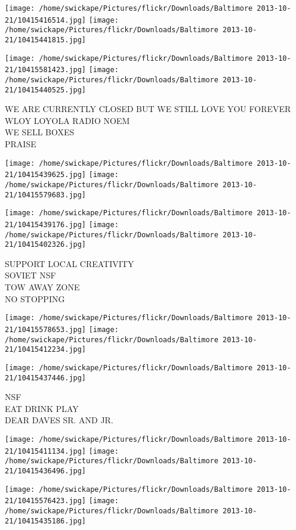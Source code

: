 \documentclass[10pt,letterpaper]{article}
\begin{document}
\texttt{[image: /home/swickape/Pictures/flickr/Downloads/Baltimore 2013-10-21/10415416514.jpg]}
\texttt{[image: /home/swickape/Pictures/flickr/Downloads/Baltimore 2013-10-21/10415441815.jpg]}

\texttt{[image: /home/swickape/Pictures/flickr/Downloads/Baltimore 2013-10-21/10415581423.jpg]}
\texttt{[image: /home/swickape/Pictures/flickr/Downloads/Baltimore 2013-10-21/10415440525.jpg]}

WE ARE CURRENTLY CLOSED BUT WE STILL LOVE YOU FOREVER\\
WLOY LOYOLA RADIO NOEM\\
WE SELL BOXES\\
PRAISE
\pagebreak

\texttt{[image: /home/swickape/Pictures/flickr/Downloads/Baltimore 2013-10-21/10415439625.jpg]}
\texttt{[image: /home/swickape/Pictures/flickr/Downloads/Baltimore 2013-10-21/10415579683.jpg]}

\texttt{[image: /home/swickape/Pictures/flickr/Downloads/Baltimore 2013-10-21/10415439176.jpg]}
\texttt{[image: /home/swickape/Pictures/flickr/Downloads/Baltimore 2013-10-21/10415402326.jpg]}

SUPPORT LOCAL CREATIVITY\\
SOVIET NSF\\
TOW AWAY ZONE\\
NO STOPPING
\pagebreak

\texttt{[image: /home/swickape/Pictures/flickr/Downloads/Baltimore 2013-10-21/10415578653.jpg]}
\texttt{[image: /home/swickape/Pictures/flickr/Downloads/Baltimore 2013-10-21/10415412234.jpg]}

\vspace{0.25in}
\texttt{[image: /home/swickape/Pictures/flickr/Downloads/Baltimore 2013-10-21/10415437446.jpg]}

NSF\\
EAT DRINK PLAY\\
DEAR DAVES SR. AND JR.
\pagebreak

\texttt{[image: /home/swickape/Pictures/flickr/Downloads/Baltimore 2013-10-21/10415411134.jpg]}
\texttt{[image: /home/swickape/Pictures/flickr/Downloads/Baltimore 2013-10-21/10415436496.jpg]}

\texttt{[image: /home/swickape/Pictures/flickr/Downloads/Baltimore 2013-10-21/10415576423.jpg]}
\texttt{[image: /home/swickape/Pictures/flickr/Downloads/Baltimore 2013-10-21/10415435186.jpg]}
\end{document}

